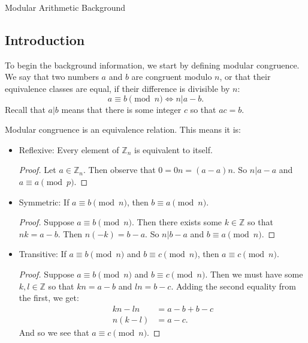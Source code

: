 \documentclass{article}
\begin{document}
    \huge Modular Arithmetic Background
    \normalsize
\begin{enumerate} 

    \section{Introduction}

    To begin the background information, we start by defining modular congruence. We say that two numbers $a$ and $b$ are congruent modulo $n$, or that their equivalence classes are equal, if their difference is divisible by $n$:
    \[
    a\equiv b\pmod{n}\iff n|a-b
    .\] 
    Recall that $a|b$ means that there is some integer $c$ so that $ac=b$.

    Modular congruence is an equivalence relation. This means it is:
    \begin{itemize}

        \item Reflexive: Every element of $\mathbb{Z}_n$ is equivalent to itself.
            \begin{proof} 
                Let $a\in \mathbb{Z}_n$. Then observe that $0=0n=(a-a)n$. So $n|a-a$ and $a\equiv a\pmod{p}$.
            \end{proof}
        \item Symmetric: If $a\equiv b\pmod{n}$, then $b\equiv a \pmod{n}$.
            \begin{proof} 
                Suppose $a\equiv b\pmod{n}$. Then there exists some $k\in \mathbb{Z}$
                so that $nk=a-b$. Then $n(-k)=b-a$. So $n|b-a$ and $b\equiv a\pmod{n}$.
            \end{proof}
        \item Transitive: If $a\equiv b\pmod{n}$ and $b\equiv c\pmod{n}$, then $a\equiv c \pmod{n}$.
            \begin{proof} 
                Suppose $a\equiv b\pmod{n}$ and $b\equiv c\pmod{n}$. Then we must have
                some $k,l\in \mathbb{Z}$ so that $kn=a-b$ and $ln=b-c$. Adding
                the second equality from the first, we get:
                \begin{align*}
                    kn- l n&= a-b+b-c \\
                    n(k- l) &= a-c 
                .\end{align*}
                And so we see that $a\equiv c\pmod{n}$.
            \end{proof}
    \end{itemize}
    
\end{enumerate}
\end{document}
